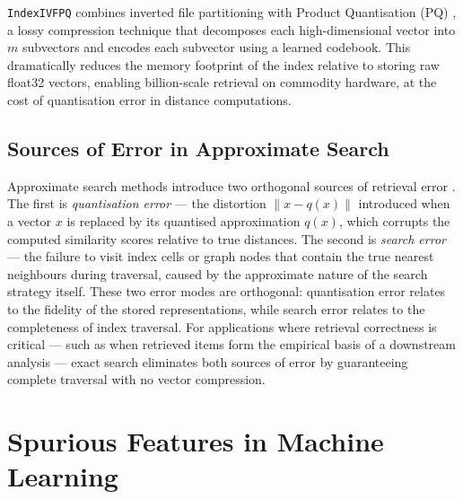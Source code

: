 \texttt{IndexIVFPQ} combines inverted file partitioning with Product 
Quantisation (PQ) \cite{Jegou_2011_PQ}, a lossy compression technique 
that decomposes each high-dimensional vector into $m$ subvectors and 
encodes each subvector using a learned codebook. This dramatically 
reduces the memory footprint of the index relative to storing raw 
float32 vectors, enabling billion-scale retrieval on commodity hardware, 
at the cost of quantisation error in distance computations.

\subsection*{Sources of Error in Approximate Search}

Approximate search methods introduce two orthogonal sources of 
retrieval error \cite{Douze_2024_FAISS}. The first is 
\textit{quantisation error} --- the distortion $\|x - q(x)\|$ 
introduced when a vector $x$ is replaced by its quantised 
approximation $q(x)$, which corrupts the computed similarity scores 
relative to true distances. The second is \textit{search error} --- 
the failure to visit index cells or graph nodes that contain the true 
nearest neighbours during traversal, caused by the approximate nature 
of the search strategy itself. These two error modes are orthogonal: 
quantisation error relates to the fidelity of the stored 
representations, while search error relates to the completeness of 
index traversal. For applications where retrieval correctness is 
critical --- such as when retrieved items form the empirical basis of 
a downstream analysis --- exact search eliminates both sources of error 
by guaranteeing complete traversal with no vector compression.


\section{Spurious Features in Machine Learning}
\label{sec:spurious_features}

